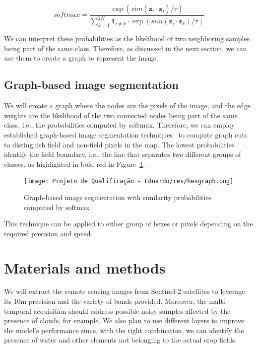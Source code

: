 \documentclass[12pt]{article}
\begin{document}
\begin{equation}
softmax=\frac{\exp{\left(sim(\boldsymbol{z}_i\cdot\boldsymbol{z}_j)/\tau\right)}}{\sum_{k=1}^{2N}\mathbf{1}_{i\neq k}\cdot\exp{\left(sim(\boldsymbol{z}_i\cdot\boldsymbol{z}_k)/\tau\right)}}
\label{eqn:softmax}
\end{equation}

We can interpret these probabilities as the likelihood of two neighboring samples being part of the same class. Therefore, as discussed in the next section, we can use them to create a graph to represent the image.

\subsection{Graph-based image segmentation}\label{subsection:graphbasedsegmentation}

We will create a graph where the nodes are the pixels of the image, and the edge weights are the likelihood of the two connected nodes being part of the same class, i.e., the probabilities computed by softmax. Therefore, we can employ established graph-based image segmentation techniques~\citep{felzenszwalb2004} to compute graph cuts~\citep{veksler2001} to distinguish field and non-field pixels in the map. The lowest probabilities identify the field boundary, i.e., the line that separates two different groups of classes, as highlighted in bold red in Figure~\ref{figure:hexgraph}.

\begin{figure}[ht]
\centering
\texttt{[image: Projeto de Qualificação - Eduardo/res/hexgraph.png]}
\caption{\label{figure:hexgraph}Graph-based image segmentation with similarity probabilities computed by softmax\protect}
\end{figure}

This technique can be applied to either group of hexes or pixels depending on the required precision and speed.

\section{Materials and methods}\label{section:materiais}

We will extract the remote sensing images from Sentinel-2 satellites to leverage its 10m precision and the variety of bands provided. Moreover, the multi-temporal acquisition should address possible noisy samples affected by the presence of clouds, for example. We also plan to use different layers to improve the model's performance since, with the right combination, we can identify the presence of water and other elements not belonging to the actual crop fields.
\end{document}
